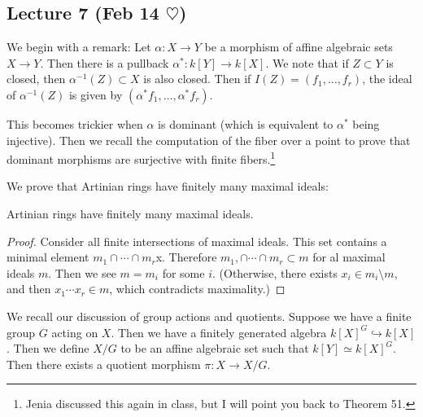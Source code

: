\documentclass[twoside, 10pt]{article}
\begin{document}
    \subsection{Lecture 7 (Feb 14 $\heartsuit$)}

    We begin with a remark: Let $\alpha: X \rightarrow Y$ be a morphism of affine algebraic sets $X \rightarrow Y$. Then there is a pullback $\alpha^*: k[Y] \rightarrow k[X]$. We note that if $Z \subset Y$ is closed, then $\alpha^{-1}(Z) \subset X$ is also closed. Then if $I(Z) = (f_1, \ldots, f_r)$, the ideal of $\alpha^{-1}(Z)$ is given by $(\alpha^*f_1, \ldots, \alpha^*f_r)$.

    This becomes trickier when $\alpha$ is dominant (which is equivalent to $\alpha^*$ being injective). Then we recall the computation of the fiber over a point to prove that dominant morphisms are surjective with finite fibers.\footnote{Jenia discussed this again in class, but I will point you back to Theorem 51.}

    We prove that Artinian rings have finitely many maximal ideals:

    \begin{lem}
        Artinian rings have finitely many maximal ideals.
        \begin{proof}
            Consider all finite intersections of maximal ideals. This set contains a minimal element $m_1 \cap \cdots \cap m_r$x. Therefore $m_1, \cap \cdots \cap m_r \subset m$ for al maximal ideals $m$. Then we see $m = m_i$ for some $i$. (Otherwise, there exists $x_i \in m_i \setminus m$, and then $x_1\cdots x_r \in m$, which contradicts maximality.)
        \end{proof}
    \end{lem}

    We recall our discussion of group actions and quotients. Suppose we have a finite group $G$ acting on $X$. Then we have a finitely generated algebra $k[X]^G \hookrightarrow k[X]$. Then we define $X/G$ to be an affine algebraic set such that $k[Y] \simeq k[X]^G$. Then there exists a quotient morphism $\pi: X \rightarrow X/G$.
\end{document}
